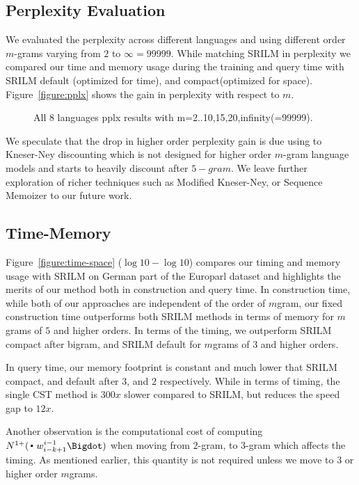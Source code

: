 \subsection{Perplexity Evaluation}
We evaluated the perplexity across different languages and using different order $m$-grams varying from $2$ to $\infty=99999$. While matching SRILM in perplexity we compared our time and memory usage during the training and query time with SRILM default (optimized for time), and compact(optimized for space). Figure~\ref{figure:pplx} shows the gain in perplexity with respect to $m$. 
\begin{figure}

\caption{All 8 languages pplx results with m=2..10,15,20,infinity(=99999).}
\end{figure}\label{figure:pplx}
We speculate that the drop in higher order perplexity gain is due using to Kneser-Ney discounting which is not designed for higher order $m$-gram language models and starts to heavily discount after $5-gram$. We leave further exploration of richer techniques such as Modified Kneser-Ney, or Sequence Memoizer to our future work. 
\subsection{Time-Memory}
Figure~\ref{figure:time-space} ($\log10-\log10$) compares our timing and memory usage with SRILM on German part of the Europarl dataset and highlights the merits of our method both in construction and query time. In construction time, while both of our approaches are independent of the order of $m$gram, our fixed construction time outperforms both SRILM methods in terms of memory for $m$grams of $5$ and higher orders. In terms of the timing, we outperform SRILM compact after bigram, and SRILM default for $m$grams of $3$ and higher orders.

In query time, our memory footprint is constant and much lower that SRILM compact, and default after $3$, and $2$ respectively. While in terms of timing, the single CST method is $300x$ slower compared to SRILM, but reduces the speed gap to $12x$.  

Another observation is the computational cost of computing $\nlplus{\Bigcdot w_{i-k+1}^{i-1} \Bigdot}$ when moving from $2$-gram, to $3$-gram which affects the timing. As mentioned earlier, this quantity is not required unless we move to $3$ or higher order $m$grams.

